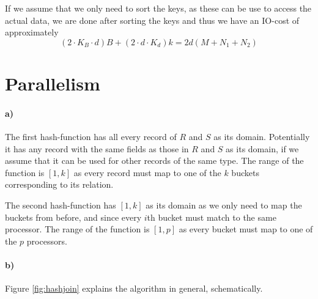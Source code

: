 \documentclass[a4paper, 11pt]{article}
\begin{document}
If we assume that we only need to sort the keys, as these can be use to access the actual data, we are done after sorting the keys and thus we have an IO-cost of approximately
\[
    (2 \cdot K_B \cdot d) B + (2 \cdot d \cdot K_d) k =
    2 d (M + N_1 + N_2)
\]





\section{Parallelism} %
\label{sec:parallelism}

\paragraph{a)} %

The first hash-function has all every record of $R$ and $S$ as its domain. Potentially it has any record with the same fields as those in $R$ and $S$ as its domain, if we assume that it can be used for other records of the same type. The range of the function is $[1, k]$ as every record must map to one of the $k$ buckets corresponding to its relation.

The second hash-function has $[1, k]$ as its domain as we only need to map the buckets from before, and since every $i$th bucket must match to the same processor. The range of the function is $[1, p]$ as every bucket must map to one of the $p$ processors.

\paragraph{b)} %

Figure \ref{fig:hashjoin} explains the algorithm in general, schematically.
\end{document}
